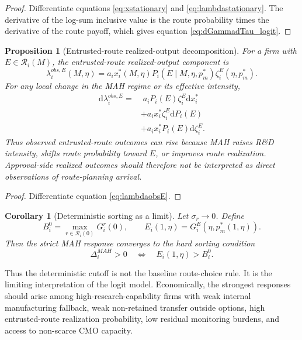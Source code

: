 \documentclass[12pt]{article}
\newtheorem{proposition}{Proposition}
\newtheorem{corollary}{Corollary}
\newcommand{\1}{\mathbf{1}}
\newcommand{\dd}{\mathrm{d}}
\newcommand{\calR}{\mathcal{R}}
\begin{document}
\begin{proof}
Differentiate equations \eqref{eq:xstationary} and \eqref{eq:lambdastationary}. The derivative of the log-sum inclusive value is the route probability times the derivative of the route payoff, which gives equation \eqref{eq:dGammadTau_logit}.
\end{proof}

\begin{proposition}[Entrusted-route realized-output decomposition]
\label{prop:observed_output_decomposition}
For a firm with $E\in\calR_i(M)$, the entrusted-route realized-output component is
\[
    \lambda_i^{obs,E}(M,\eta)
    =
    a_i x_i^*(M,\eta)P_i(E\mid M,\eta,p_m^*)\zeta_i^E(\eta,p_m^*).
\]
For any local change in the MAH regime or its effective intensity,
\begin{equation}
    \begin{aligned}
    \dd \lambda_i^{obs,E}
    =&\;
    a_i P_i(E)\zeta_i^E\dd x_i^* \\
    &+
    a_i x_i^*\zeta_i^E\dd P_i(E) \\
    &+
    a_i x_i^*P_i(E)\dd\zeta_i^E.
    \end{aligned}
    \label{eq:obsE_decomposition}
\end{equation}
Thus observed entrusted-route outcomes can rise because MAH raises R\&D intensity, shifts route probability toward $E$, or improves route realization. Approval-side realized outcomes should therefore not be interpreted as direct observations of route-planning arrival.
\end{proposition}

\begin{proof}
Differentiate equation \eqref{eq:lambdaobsE}.
\end{proof}

\begin{corollary}[Deterministic sorting as a limit]
\label{cor:deterministic_sorting_limit}
Let $\sigma_r\to0$. Define
\[
    B_i^0=\max_{r\in\calR_i(0)}G_i^r(0),
    \qquad
    E_i(1,\eta)=G_i^E(\eta,p_m^*(1,\eta)).
\]
Then the strict MAH response converges to the hard sorting condition
\begin{equation}
    \Delta_i^{MAH}>0
    \quad\Longleftrightarrow\quad
    E_i(1,\eta)>B_i^0.
    \label{eq:deterministic_sorting_limit}
\end{equation}
\end{corollary}

Thus the deterministic cutoff is not the baseline route-choice rule. It is the limiting interpretation of the logit model. Economically, the strongest responses should arise among high-research-capability firms with weak internal manufacturing fallback, weak non-retained transfer outside options, high entrusted-route realization probability, low residual monitoring burdens, and access to non-scarce CMO capacity.
\end{document}
